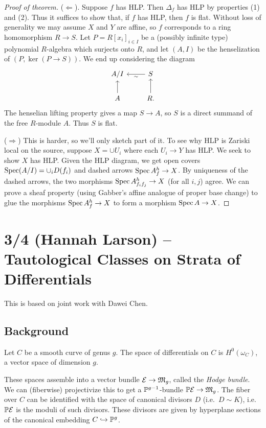 \documentclass{article}
\begin{document}
\begin{proof}[Proof of theorem]
	($\Leftarrow$). Suppose $f$ has HLP.
	Then $\Delta_f$ has HLP by properties (1) and (2).
	Thus it suffices to show that, if $f$ has HLP, then $f$ is flat.
	Without loss of generality we may assume $X$ and $Y$ are affine, so $f$ corresponds to a ring homomorphism $R \to S$.
	Let $P = R[x_i]_{i \in I}$ be a (possibly infinite type) polynomial $R$-algebra which surjects onto $R$, and let $(A, I)$ be the henselization of $(P, \ker(P \to S))$.
	We end up considering the diagram
	\[
  \begin{tikzcd}
		A/I & S \lar["\sim"] \\
		A \uar & R \uar.
  \end{tikzcd}
	\]
	The henselian lifting property gives a map $S \to A$, so $S$ is a direct summand of the free $R$-module $A$.
	Thus $S$ is flat.

	($\Rightarrow$) This is harder, so we'll only sketch part of it.
	To see why HLP is Zariski local on the source, suppose $X = \cup U_i$ where each $U_i \to Y$ has HLP.
	We seek to show $X$ has HLP.
	Given the HLP diagram, we get open covers $\operatorname{Spec}(A / I) = \cup_i D(f_i)$ and dashed arrows $\operatorname{Spec} A_f^h \to X$.
	By uniqueness of the dashed arrows, the two morphisms $\operatorname{Spec} A_{f_i f_j}^h \to X$ (for all $i, j$) agree.
	We can prove a sheaf property (using Gabber's affine analogue of proper base change) to glue the morphisms $\operatorname{Spec} A_f^h \to X$ to form a morphism $\operatorname{Spec} A \to X$.
\end{proof}

\section{3/4 (Hannah Larson) -- Tautological Classes on Strata of Differentials}

This is based on joint work with Dawei Chen.

\subsection{Background}

Let $C$ be a smooth curve of genus $g$.
The space of differentials on $C$ is $H^0(\omega_C)$, a vector space of dimension $g$.

These spaces assemble into a vector bundle $\mathcal{E} \to \mathfrak{M}_g$, called the \emph{Hodge bundle}.
We can (fiberwise) projectivize this to get a $\mathbb{P}^{g-1}$-bundle $\mathbb{P} \mathcal{E} \to \mathfrak{M}_g$.
The fiber over $C$ can be identified with the space of canonical divisors $D$ (i.e.\ $D \sim K$), i.e.\ $\mathbb{P} \mathcal{E}$ is the moduli of such divisors.
These divisors are given by hyperplane sections of the canonical embedding $C \hookrightarrow \mathbb{P}^g$.
\end{document}
